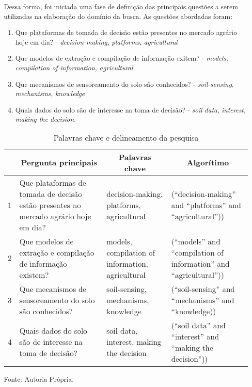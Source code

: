 \documentclass[
article,			%
12pt,				%
oneside,			%
a4paper,			%
english,			%
brazil,				%
sumario=tradicional
]{abntex2}
\begin{document}
Dessa forma, foi iniciada uma fase de definição das principais questões a serem utilizadas na elaboração do domínio da busca. As questões abordadas foram:

\begin{enumerate}
  \item Que plataformas de tomada de decisão estão presentes no mercado agrário hoje em dia? - \textit{decision-making, platforms, agricultural} 
  \item Que modelos de extração e compilação de informação exitem? - \textit{models, compilation of information, agricultural}
  \item Que mecanismos de sensoreamento do solo são conhecidos? - \textit{soil-sensing, mechanisms, knowledge}
  \item Quais dados do solo são de interesse na toma de decisão? - \textit{soil data, interest, making the decision}.

\end{enumerate}

\begin{table}[!htb]
  \centering
  \caption{Palavras chave e delineamento da pesquisa}
  \begin{tabular}{|p{1cm}|p{4cm}|p{4cm}|p{4cm}|}
    \hline
  & \multicolumn{1}{c|}{\textbf{Pergunta principais}}                                        & \multicolumn{1}{c|}{\textbf{Palavras chave}}           & \multicolumn{1}{c|}{\textbf{Algorítimo}} \\ \hline
    1 & Que plataformas de tomada de decisão estão presentes no mercado agrário hoje em dia? & decision-making, platforms, agricultural         & (``decision-making'' and  “platforms'' and “agricultural''))         \\ \hline
    2 & Que modelos de extração e compilação de informação existem?                            & models, compilation of information, agricultural & (``models'' and  “compilation of information'' and “agricultural'')) \\ \hline
    3 & Que mecanismos de sensoreamento do solo são conhecidos?                              & soil-sensing, mechanisms, knowledge              & (``soil-sensing'' and  “mechanisms'' and “knowledge))              \\ \hline
    4 & Quais dados do solo são de interesse na toma de decisão?                             & soil data, interest, making the decision         & (``soil data'' and  “interest'' and “making the decision''))         \\ \hline
  \end{tabular}
  \clearpage

  {Fonte: Autoria Própria.}
\end{table}
\end{document}
